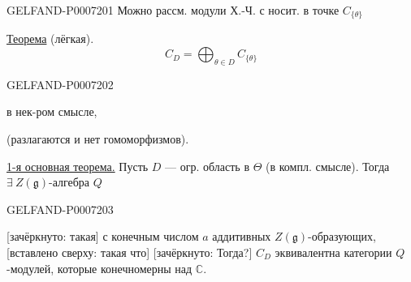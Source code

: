 \begin{GelfandAdjacentEvidence}{GELFAND-P000720}{1}
Можно рассм. модули Х.-Ч. с носит. в точке \(C_{\{\theta\}}\)

\underline{Теорема} (лёгкая).
\[
C_D=\bigoplus_{\theta\in D}C_{\{\theta\}}
\]
\end{GelfandAdjacentEvidence}
\begin{GelfandAdjacentEvidence}{GELFAND-P000720}{2}

в нек-ром смысле,

(разлагаются и нет гомоморфизмов).

\underline{1-я основная теорема.} Пусть \(D\) --- огр. область в \(\Theta\)
(в компл. смысле). Тогда \(\exists\ Z(\mathfrak g)\)-алгебра \(Q\)
\end{GelfandAdjacentEvidence}
\begin{GelfandAdjacentEvidence}{GELFAND-P000720}{3}

[зачёркнуто: такая] с конечным числом \(a\) аддитивных \(Z(\mathfrak g)\)-образующих,
[вставлено сверху: такая что] [зачёркнуто: Тогда?]
\(C_D\) эквивалентна категории \(Q\)-модулей, которые конечномерны над \(\mathbb C\).
\end{GelfandAdjacentEvidence}
